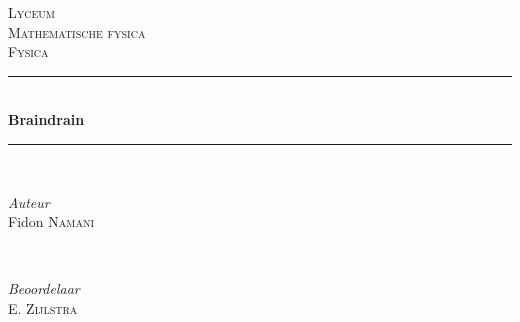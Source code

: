 \begin{titlepage} 
	\newcommand{\HRule}{\rule{\linewidth}{0.5mm}} %
	
	\center %
	
	
	\textsc{\LARGE Lyceum}\\[1.5cm] %
	
	\textsc{\Large Mathematische fysica}\\[0.5cm] %
	
	\textsc{\large Fysica}\\[0.5cm] %
	
	
	\HRule\\[0.4cm] %
	
	{\huge\bfseries Braindrain}\\[0.4cm] %
	
	\HRule\\[1.5cm]
	
	
	\begin{minipage}{0.4\textwidth}
		\begin{flushleft} %
			\large
			\textit{Auteur}\\
			Fidon \textsc{Namani}\\ %
		
		\end{flushleft}
	\end{minipage}
	~ %
	\begin{minipage}{0.4\textwidth}
		\begin{flushright} %
			\large
			\textit{Beoordelaar}\\
			 \textsc{E. Zijlstra} %
		\end{flushright}
	\end{minipage}



\end{titlepage}
